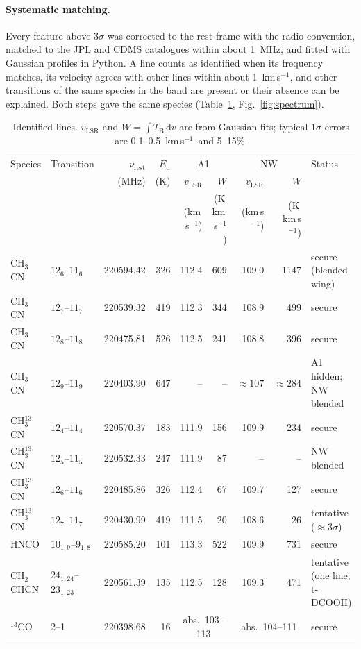 \documentclass{aa}
\newcommand{\kms}{km\,s$^{-1}$}
\newcommand{\chcn}{CH$_3$CN}
\newcommand{\chtcn}{CH$_3^{13}$CN}
\newcommand{\vycn}{CH$_2$CHCN}
\newcommand{\tco}{$^{13}$CO}
\begin{document}
\paragraph{Systematic matching.} Every feature above $3\sigma$ was corrected to the rest frame with the radio convention, matched to the JPL \citep{pickett1998} and CDMS \citep{muller2005} catalogues within about 1~MHz, and fitted with Gaussian profiles in Python. A line counts as identified when its frequency matches, its velocity agrees with other lines within about 1~\kms, and other transitions of the same species in the band are present or their absence can be explained. Both steps gave the same species (Table~\ref{tab:lines}, Fig.~\ref{fig:spectrum}).

\begin{table}
\caption{Identified lines. $v_\mathrm{LSR}$ and $W=\int T_\mathrm{B}\,\mathrm{d}v$ are from Gaussian fits; typical $1\sigma$ errors are 0.1--0.5~\kms\ and 5--15\%.}
\label{tab:lines}
\centering
\begin{tabular}{llrrrrrrl}
\hline\hline
Species & Transition & $\nu_\mathrm{rest}$ & $E_\mathrm{u}$ & \multicolumn{2}{c}{A1} & \multicolumn{2}{c}{NW} & Status \\
 & & (MHz) & (K) & $v_\mathrm{LSR}$ & $W$ & $v_\mathrm{LSR}$ & $W$ & \\
 & & & & (\kms) & (K\,\kms) & (\kms) & (K\,\kms) & \\
\hline
\chcn & $12_6$--$11_6$ & 220594.42 & 326 & 112.4 & 609 & 109.0 & 1147 & secure (blended wing) \\
\chcn & $12_7$--$11_7$ & 220539.32 & 419 & 112.3 & 344 & 108.9 & 499 & secure \\
\chcn & $12_8$--$11_8$ & 220475.81 & 526 & 112.5 & 241 & 108.8 & 396 & secure \\
\chcn & $12_9$--$11_9$ & 220403.90 & 647 & -- & -- & $\approx107$ & $\approx284$ & A1 hidden; NW blended \\
\chtcn & $12_4$--$11_4$ & 220570.37 & 183 & 111.9 & 156 & 109.9 & 234 & secure \\
\chtcn & $12_5$--$11_5$ & 220532.33 & 247 & 111.9 & 87 & -- & -- & NW blended \\
\chtcn & $12_6$--$11_6$ & 220485.86 & 326 & 112.4 & 67 & 109.7 & 127 & secure \\
\chtcn & $12_7$--$11_7$ & 220430.99 & 419 & 111.5 & 20 & 108.6 & 26 & tentative ($\approx3\sigma$) \\
HNCO & $10_{1,9}$--$9_{1,8}$ & 220585.20 & 101 & 113.3 & 522 & 109.9 & 731 & secure \\
\vycn & $24_{1,24}$--$23_{1,23}$ & 220561.39 & 135 & 112.5 & 128 & 109.3 & 471 & tentative (one line; t-DCOOH) \\
\tco & 2--1 & 220398.68 & 16 & \multicolumn{2}{c}{abs.\ 103--113} & \multicolumn{2}{c}{abs.\ 104--111} & secure \\
\hline
\end{tabular}
\end{table}
\end{document}
